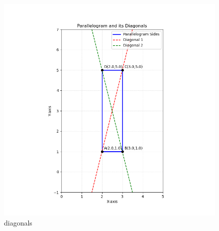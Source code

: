 \documentclass[journal]{IEEEtran}
\theoremstyle{remark}
\begin{document}
\begin{figure}[H]
    \centering
    \includegraphics[width=0.9\columnwidth]{figs/diagonals.png}
    \caption{diagonals}
    \label{fig:placeholder_1}
\end{figure}
\end{document}
